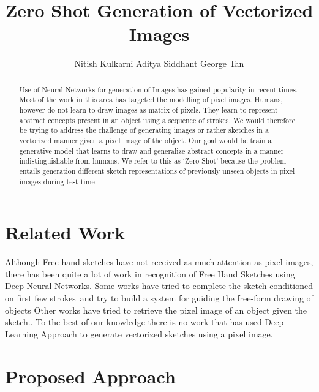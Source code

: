 \documentclass{article}
\title{Zero Shot Generation of Vectorized Images}
\author{
  Nitish Kulkarni \And Aditya Siddhant \And George Tan \\
}
\begin{document}

\maketitle

\begin{abstract}
Use of Neural Networks for generation of Images has gained popularity in recent times.  Most of the work in this area has targeted the modelling of pixel images. Humans, however do not learn to draw images as matrix of pixels. They learn to represent abstract concepts present in an object using a sequence of strokes. We would therefore be trying to address the challenge of generating images or rather sketches in a vectorized manner given a pixel image of the object. Our goal would be train a generative model that learns to draw and generalize abstract concepts in a manner indistinguishable from humans. We refer to this as `Zero Shot' because the problem entails generation different sketch representations of previously unseen objects in pixel images during test time.
\end{abstract}

\section{Related Work}
Although Free hand sketches have not received as much attention as pixel images, there has been quite a lot of work in recognition of Free Hand Sketches using Deep Neural Networks.\cite{rcp1} \cite{qdpaper} Some works have tried to complete the sketch conditioned on first few strokes\ and try to build a system for guiding the free-form drawing of objects\cite{qdpaper} \cite{rcp2} Other works have tried to retrieve the pixel image of an object given the sketch.\cite{sketchydb}. To the best of our knowledge there is no work that has used Deep Learning Approach to generate vectorized sketches using a pixel image.

\section{Proposed Approach}
\end{document}
